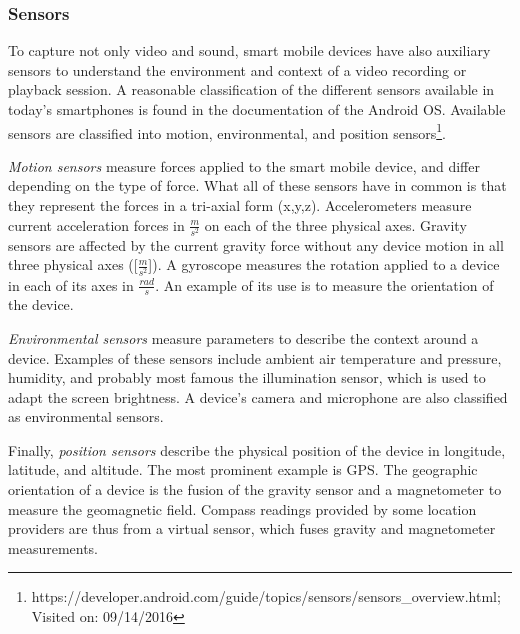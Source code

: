 \subsubsection{Sensors}
To capture not only video and sound, smart mobile devices have also auxiliary sensors to understand the environment and context of a video recording or playback session.
A reasonable classification of the different sensors available in today's smartphones is found in the documentation of the Android \ac{OS}.
Available sensors are classified into motion, environmental, and position sensors\footnote{https://developer.android.com/guide/topics/sensors/sensors\_overview.html; Visited on: 09/14/2016}.

\emph{Motion sensors} measure forces applied to the smart mobile device, and differ depending on the type of force. 
What all of these sensors have in common is that they represent the forces in a tri-axial form (x,y,z).
Accelerometers measure current acceleration forces in $\unit{\frac{m}{s^2}}$ on each of the three physical axes.
Gravity sensors are affected by the current gravity force without any device motion in all three physical axes ([$\unit{\frac{m}{s^2}}$]).
A gyroscope measures the rotation applied to a device in each of its axes in $\unit{\frac{rad}{s}}$. 
An example of its use is to measure the orientation of the device.

\emph{Environmental sensors} measure parameters to describe the context around a device. 
Examples of these sensors include ambient air temperature and pressure, humidity, and probably most famous the illumination sensor, which is used to adapt the screen brightness. 
A device's camera and microphone are also classified as environmental sensors.

Finally, \emph{position sensors} describe the physical position of the device in longitude, latitude, and altitude.
The most prominent example is \ac{GPS}.
The geographic orientation of a device is the fusion of the gravity sensor and a magnetometer to measure the geomagnetic field.
Compass readings provided by some location providers are thus from a virtual sensor, which fuses gravity and magnetometer measurements. 
